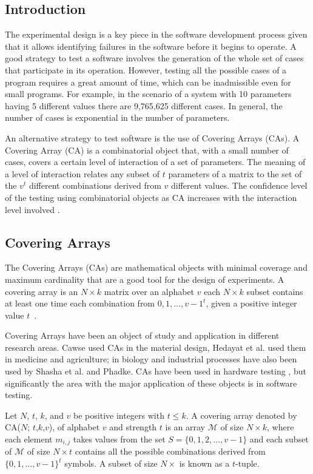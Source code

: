 \subsection{Introduction}
The experimental design is a key piece in the software development process given that it allows identifying failures in the software before it begins to operate. A good strategy to test a software involves the generation of the whole set of cases that participate in its operation. However, testing all the possible cases of a program requires a great amount of time, which can be inadmissible even for small programs\cite{Cohen:2003}. For example, in the scenario of a system with 10 parameters having 5 different values there are 9,765,625 different cases. In general, the number of cases is exponential in the number of parameters.

An alternative strategy to test software is the use of Covering Arrays (CAs). A Covering Array (CA) is a combinatorial object that, with a small number of cases, covers a certain level of interaction of a set of parameters. The meaning of a level of interaction relates any subset of $t$ parameters of a matrix to the set of the $v^{t}$ different combinations derived from $v$ different values. The confidence level of the testing using combinatorial objects as CA increases with the interaction level involved \cite{Kuhn:2008}.

\subsection{Covering Arrays}
The Covering Arrays (CAs) are mathematical objects with minimal coverage and maximum cardinality that are a good tool for the design of experiments. A covering array is an $N \times k$ matrix over an alphabet $v$ each $N \times k$ subset contains at least one time each combination from ${0,1,\ldots,v−1}^{t}$, given a positive integer value $t$~\cite{Avila-George:2012}.

Covering Arrays have been an object of study and application in different research areas. Cawse \cite{Cawse:2003} used CAs in the material design, Hedayat et al. \cite{Hedayat:1999} used them in medicine and agriculture; in biology and industrial processes have also been used by Shasha et al. \cite{Shasha:2001} and Phadke\cite{Phadke:1995}. CAs have been used in hardware testing \cite{Vadde:2004}, but significantly the area with the major application of these objects is in software testing\cite{Burr:1998,Yilmaz:2004}.

Let $N$, $t$, $k$, and $v$ be positive integers with $t \leq k$. A covering array denoted by CA($N$; $t$,$k$,$v$), of alphabet $v$ and strength $t$ is an array $\mathcal{M}$ of size $N \times k$, where each element $m_{i,j}$ takes values from the set $S = \{0,1,2,\ldots,v-1\}$ and each subset of $\mathcal{M}$ of size $N \times t$ contains all the possible combinations derived from $\{0,1,\ldots,v-1\}^{t}$ symbols. A subset of size $N \times $ is known as a $t$-tuple.

